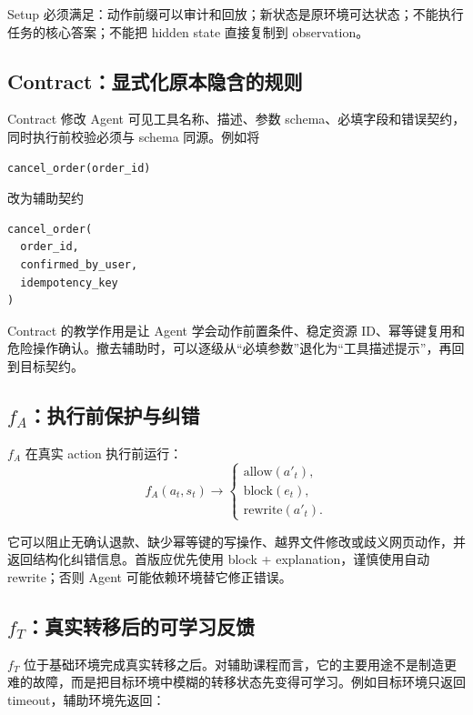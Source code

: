 \documentclass[11pt,a4paper,fontset=fandol]{ctexart}
\newcommand{\fA}{f_A}
\newcommand{\fT}{f_T}
\begin{document}
Setup 必须满足：动作前缀可以审计和回放；新状态是原环境可达状态；不能执行任务的核心答案；不能把 hidden state 直接复制到 observation。

\subsection{Contract：显式化原本隐含的规则}

Contract 修改 Agent 可见工具名称、描述、参数 schema、必填字段和错误契约，同时执行前校验必须与 schema 同源。例如将

\begin{lstlisting}
cancel_order(order_id)
\end{lstlisting}

改为辅助契约

\begin{lstlisting}
cancel_order(
  order_id,
  confirmed_by_user,
  idempotency_key
)
\end{lstlisting}

Contract 的教学作用是让 Agent 学会动作前置条件、稳定资源 ID、幂等键复用和危险操作确认。撤去辅助时，可以逐级从“必填参数”退化为“工具描述提示”，再回到目标契约。

\subsection{$\fA$：执行前保护与纠错}

$\fA$ 在真实 action 执行前运行：
\begin{equation}
\fA(a_t,s_t)\rightarrow
\begin{cases}
\text{allow}(a'_t),\\
\text{block}(e_t),\\
\text{rewrite}(a'_t).
\end{cases}
\end{equation}

它可以阻止无确认退款、缺少幂等键的写操作、越界文件修改或歧义网页动作，并返回结构化纠错信息。首版应优先使用 block + explanation，谨慎使用自动 rewrite；否则 Agent 可能依赖环境替它修正错误。

\subsection{$\fT$：真实转移后的可学习反馈}

$\fT$ 位于基础环境完成真实转移之后。对辅助课程而言，它的主要用途不是制造更难的故障，而是把目标环境中模糊的转移状态先变得可学习。例如目标环境只返回 timeout，辅助环境先返回：
\end{document}
